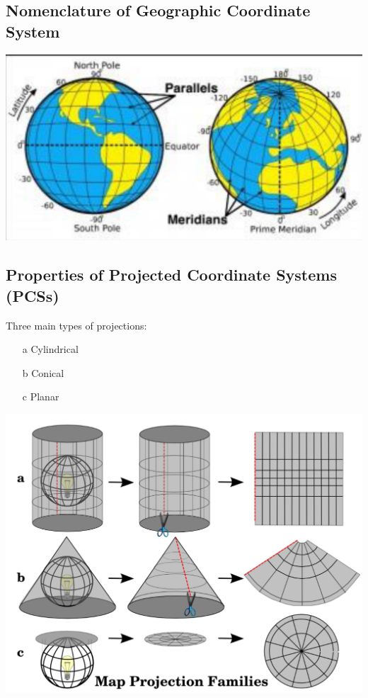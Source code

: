 \documentclass[11pt]{article}
\theoremstyle{definition}
\begin{document}
\subsection{Nomenclature of Geographic
Coordinate System}
\includegraphics[width=\textwidth/2]{9.png}

\subsection{Properties of Projected
Coordinate Systems (PCSs)}
Three main
types of
projections:
\begin{itemize}
    \item [a] Cylindrical
    \item [b] Conical
    \item [c] Planar
\end{itemize}

\includegraphics[width=\textwidth/2]{10.png}
\end{document}
